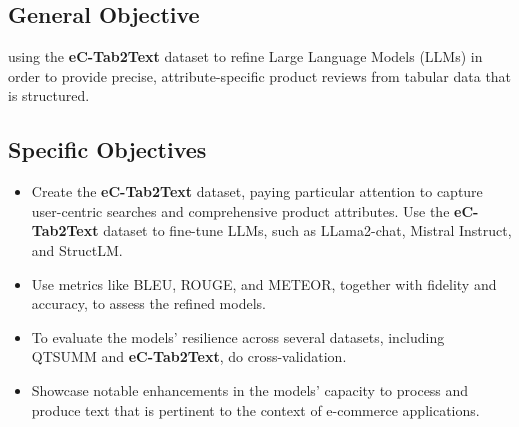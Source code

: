 \subsection{General Objective}
using the \textbf{eC-Tab2Text} dataset to refine Large Language Models (LLMs) in order to provide precise, attribute-specific product reviews from tabular data that is structured.

\subsection{Specific Objectives}
\begin{itemize}
    \item Create the \textbf{eC-Tab2Text} dataset, paying particular attention to capture user-centric searches and comprehensive product attributes.
    Use the \textbf{eC-Tab2Text} dataset to fine-tune LLMs, such as LLama2-chat, Mistral Instruct, and StructLM.
    \item Use metrics like BLEU, ROUGE, and METEOR, together with fidelity and accuracy, to assess the refined models.
    \item To evaluate the models' resilience across several datasets, including QTSUMM and \textbf{eC-Tab2Text}, do cross-validation.
    \item Showcase notable enhancements in the models' capacity to process and produce text that is pertinent to the context of e-commerce applications.
\end{itemize}